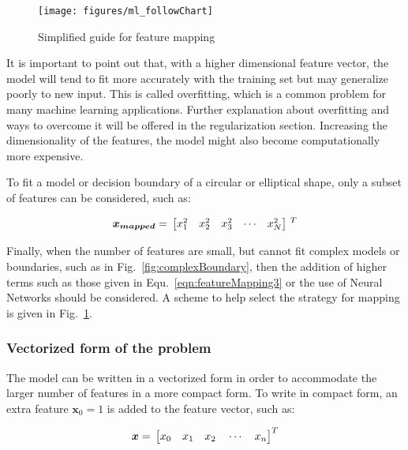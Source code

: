 \begin{figure}
\begin{center}
\texttt{[image: figures/ml\_followChart]}    %
\caption{Simplified guide for feature mapping} 
\label{fig:ml_followChart}
\end{center}
\end{figure}


It is important to point out that, with a higher dimensional feature vector, the model will tend to fit more accurately with the training set but may generalize poorly to new input. 
This is called overfitting, which is a common problem for many machine learning applications. 
Further explanation about overfitting and ways to overcome it will be offered in the regularization section. 
Increasing the dimensionality of the features, the model might also become computationally more expensive.

To fit a model or decision boundary of a circular or elliptical shape, only a subset of features can be considered, such as:

\begin{equation}{\label{eqn:featureMappin54}}
\bm{x_{mapped}}
=\,
\begin{bmatrix}
x_1^2 & x_2^2 & x_3^2 & \cdots & x_N^2  
\end{bmatrix}
\,^ T
\end{equation} 

Finally, when the number of features are small, but cannot fit complex models or boundaries, such as in Fig.~\ref{fig:complexBoundary}, then the addition of higher terms such as those given in 
Equ.~\ref{eqn:featureMapping3} or the use of Neural Networks should be considered.
A scheme to help select the strategy for mapping is given in  Fig.~\ref{fig:ml_followChart}. 

\subsubsection{Vectorized form of the problem}

The model can be written in a vectorized form in order to accommodate the larger number of features in a more compact form.
To write in compact form, an extra feature $\bm{x}_0 = 1$ is added to the feature vector, such as:

\begin{equation}{\label{eqn:featureVector}}
\bm{x}
=\,
\begin{bmatrix}
x_0 \quad x_1 \quad x_2 \quad \cdots \quad x_n 
\end{bmatrix}
^T
\end{equation} 

